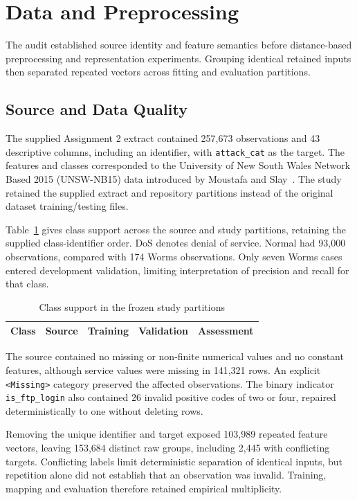 \section{Data and Preprocessing}

The audit established source identity and feature semantics before distance-based preprocessing and representation experiments. Grouping identical retained inputs then separated repeated vectors across fitting and evaluation partitions.

\subsection{Source and Data Quality}

The supplied Assignment 2 extract contained 257,673 observations and 43 descriptive columns, including an identifier, with \texttt{attack\_cat} as the target. The features and classes corresponded to the University of New South Wales Network Based 2015 (UNSW-NB15) data introduced by Moustafa and Slay~\cite{moustafa2015}. The study retained the supplied extract and repository partitions instead of the original dataset training/testing files.

Table~\ref{tab:data} gives class support across the source and study partitions, retaining the supplied class-identifier order. DoS denotes denial of service. Normal had 93,000 observations, compared with 174 Worms observations. Only seven Worms cases entered development validation, limiting interpretation of precision and recall for that class.

\begin{table}[!ht]
\caption{Class support in the frozen study partitions}
\label{tab:data}
\centering
\footnotesize
\setlength{\tabcolsep}{3pt}
\begin{tabular}{@{}lrrrr@{}}
\toprule
Class & Source & Training & Validation & Assessment \\
\midrule

\end{tabular}
\end{table}

The source contained no missing or non-finite numerical values and no constant features, although service values were missing in 141,321 rows. An explicit \texttt{<Missing>} category preserved the affected observations. The binary indicator \texttt{is\_ftp\_login} also contained 26 invalid positive codes of two or four, repaired deterministically to one without deleting rows.

Removing the unique identifier and target exposed 103,989 repeated feature vectors, leaving 153,684 distinct raw groups, including 2,445 with conflicting targets. Conflicting labels limit deterministic separation of identical inputs, but repetition alone did not establish that an observation was invalid. Training, mapping and evaluation therefore retained empirical multiplicity.


